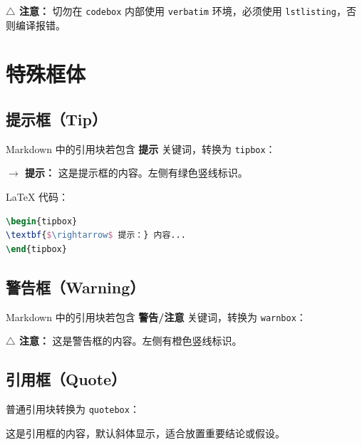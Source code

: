 \documentclass[fontset=fandol,11pt,a4paper]{ctexart}
\begin{document}
\begin{warnbox}
\textbf{$\triangle$ 注意：} 切勿在 \verb|codebox| 内部使用 \verb|verbatim| 环境，必须使用 \verb|lstlisting|，否则编译报错。
\end{warnbox}

\section{特殊框体}
\label{sec:boxes}

\subsection{提示框（Tip）}
\label{subsec:tip}

Markdown 中的引用块若包含 \textbf{提示} 关键词，转换为 \verb|tipbox|：

\begin{tipbox}
\textbf{$\rightarrow$ 提示：} 这是提示框的内容。左侧有绿色竖线标识。
\end{tipbox}

LaTeX 代码：
\begin{codebox}[LaTeX]
\begin{lstlisting}[language=TeX]
\begin{tipbox}
\textbf{$\rightarrow$ 提示：} 内容...
\end{tipbox}
\end{lstlisting}
\end{codebox}

\subsection{警告框（Warning）}
\label{subsec:warn}

Markdown 中的引用块若包含 \textbf{警告/注意} 关键词，转换为 \verb|warnbox|：

\begin{warnbox}
\textbf{$\triangle$ 注意：} 这是警告框的内容。左侧有橙色竖线标识。
\end{warnbox}

\subsection{引用框（Quote）}
\label{subsec:quote}

普通引用块转换为 \verb|quotebox|：

\begin{quotebox}
这是引用框的内容，默认斜体显示，适合放置重要结论或假设。
\end{quotebox}
\end{document}
